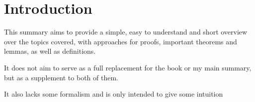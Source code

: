 \documentclass{article}
\begin{document}
\startDocument
\usetcolorboxes


\section{Introduction}
This summary aims to provide a simple, easy to understand and short overview over the topics covered, with approaches for proofs, important theorems and lemmas,
as well as definitions.

It does not aim to serve as a full replacement for the book or my main summary, but as a supplement to both of them.

It also lacks some formalism and is only intended to give some intuition






\end{document}
